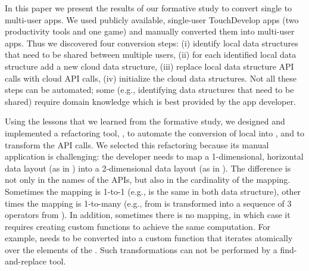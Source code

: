 \documentclass{sigplanconf}
\begin{document}
In this paper we present the results of our formative study to convert single to multi-user apps. We used \numFormative publicly available, single-user TouchDevelop apps (two productivity tools and one game) and manually converted them into multi-user apps. Thus we discovered four conversion steps: (i) identify local data structures that need to be shared between multiple users, (ii) for each identified local data structure add a new cloud data structure, (iii) replace local data structure API calls with cloud API calls, (iv) initialize the cloud data structures. Not all these steps can be automated; some (e.g., identifying data structures that need to be shared) require domain knowledge which is best provided by the app developer. 

Using the lessons that we learned from the formative study, we designed and implemented a refactoring tool, \tool, to automate the conversion of local \NC{} into , and to transform the API calls. We selected this refactoring because its manual application is 
challenging: the developer needs to map a 1-dimensional, horizontal data layout (as in ) into a 2-dimensional data layout (as in ).
The difference is not only in the names of the APIs, but also in the cardinality of the mapping.
Sometimes the mapping is 1-to-1 (e.g.,  is the same in both data structure), other times the mapping is 1-to-many (e.g.,  from  is transformed into a sequence of 3 operators from ). In addition, sometimes there is no mapping, in which case it requires creating custom functions to achieve the same computation. For example,  needs to be converted into a custom function that iterates atomically over the elements of the . Such transformations can not be performed by a find-and-replace tool.
\end{document}

